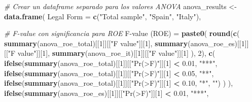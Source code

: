 \documentclass[
]{article}
\newenvironment{Shaded}{\begin{snugshade}}{\end{snugshade}}
\newcommand{\AttributeTok}[1]{\textcolor[rgb]{0.13,0.29,0.53}{#1}}
\newcommand{\CommentTok}[1]{\textcolor[rgb]{0.56,0.35,0.01}{\textit{#1}}}
\newcommand{\DecValTok}[1]{\textcolor[rgb]{0.00,0.00,0.81}{#1}}
\newcommand{\FloatTok}[1]{\textcolor[rgb]{0.00,0.00,0.81}{#1}}
\newcommand{\FunctionTok}[1]{\textcolor[rgb]{0.13,0.29,0.53}{\textbf{#1}}}
\newcommand{\NormalTok}[1]{#1}
\newcommand{\OtherTok}[1]{\textcolor[rgb]{0.56,0.35,0.01}{#1}}
\newcommand{\SpecialCharTok}[1]{\textcolor[rgb]{0.81,0.36,0.00}{\textbf{#1}}}
\newcommand{\StringTok}[1]{\textcolor[rgb]{0.31,0.60,0.02}{#1}}
\begin{document}
\begin{Shaded}
\begin{Highlighting}[]
\CommentTok{\# Crear un dataframe separado para los valores ANOVA}
\NormalTok{anova\_results }\OtherTok{\textless{}{-}} \FunctionTok{data.frame}\NormalTok{(}
  \StringTok{\textasciigrave{}}\AttributeTok{Legal Form}\StringTok{\textasciigrave{}} \OtherTok{=} \FunctionTok{c}\NormalTok{(}\StringTok{"Total sample"}\NormalTok{, }\StringTok{"Spain"}\NormalTok{, }\StringTok{"Italy"}\NormalTok{),}
  
  \CommentTok{\# F{-}value con significancia para ROE}
  \StringTok{\textasciigrave{}}\AttributeTok{F{-}value (ROE)}\StringTok{\textasciigrave{}} \OtherTok{=} \FunctionTok{paste0}\NormalTok{(}
    \FunctionTok{round}\NormalTok{(}\FunctionTok{c}\NormalTok{(}
      \FunctionTok{summary}\NormalTok{(anova\_roe\_total)[[}\DecValTok{1}\NormalTok{]][[}\StringTok{"F value"}\NormalTok{]][}\DecValTok{1}\NormalTok{],}
      \FunctionTok{summary}\NormalTok{(anova\_roe\_es)[[}\DecValTok{1}\NormalTok{]][[}\StringTok{"F value"}\NormalTok{]][}\DecValTok{1}\NormalTok{],}
      \FunctionTok{summary}\NormalTok{(anova\_roe\_it)[[}\DecValTok{1}\NormalTok{]][[}\StringTok{"F value"}\NormalTok{]][}\DecValTok{1}\NormalTok{]}
\NormalTok{    ), }\DecValTok{2}\NormalTok{),}
    \FunctionTok{c}\NormalTok{(}
      \FunctionTok{ifelse}\NormalTok{(}\FunctionTok{summary}\NormalTok{(anova\_roe\_total)[[}\DecValTok{1}\NormalTok{]][[}\StringTok{"Pr(\textgreater{}F)"}\NormalTok{]][}\DecValTok{1}\NormalTok{] }\SpecialCharTok{\textless{}} \FloatTok{0.01}\NormalTok{, }\StringTok{"***"}\NormalTok{,}
             \FunctionTok{ifelse}\NormalTok{(}\FunctionTok{summary}\NormalTok{(anova\_roe\_total)[[}\DecValTok{1}\NormalTok{]][[}\StringTok{"Pr(\textgreater{}F)"}\NormalTok{]][}\DecValTok{1}\NormalTok{] }\SpecialCharTok{\textless{}} \FloatTok{0.05}\NormalTok{, }\StringTok{"**"}\NormalTok{,}
                    \FunctionTok{ifelse}\NormalTok{(}\FunctionTok{summary}\NormalTok{(anova\_roe\_total)[[}\DecValTok{1}\NormalTok{]][[}\StringTok{"Pr(\textgreater{}F)"}\NormalTok{]][}\DecValTok{1}\NormalTok{] }\SpecialCharTok{\textless{}} \FloatTok{0.10}\NormalTok{,}
                           \StringTok{"*"}\NormalTok{, }\StringTok{""}\NormalTok{)}
\NormalTok{             )}
\NormalTok{      ),}
      \FunctionTok{ifelse}\NormalTok{(}\FunctionTok{summary}\NormalTok{(anova\_roe\_es)[[}\DecValTok{1}\NormalTok{]][[}\StringTok{"Pr(\textgreater{}F)"}\NormalTok{]][}\DecValTok{1}\NormalTok{] }\SpecialCharTok{\textless{}} \FloatTok{0.01}\NormalTok{, }\StringTok{"***"}\NormalTok{,}

\end{Highlighting}
\end{Shaded}
\end{document}
